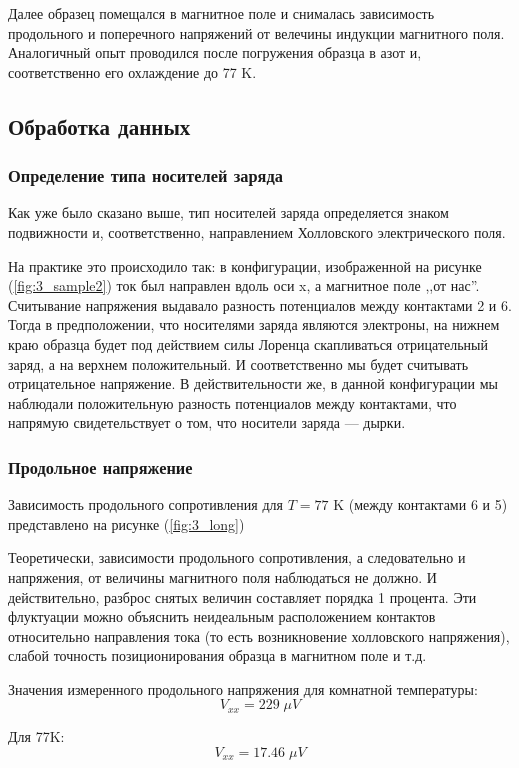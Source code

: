 \documentclass[a4paper, 12pt]{article}
\begin{document}
Далее образец помещался в магнитное поле и снималась зависимость продольного и поперечного напряжений от велечины индукции магнитного поля. Аналогичный опыт проводился после погружения образца в азот и, соответственно его охлаждение до 77 K.

\subsection{Обработка данных}
\subsubsection{Определение типа носителей заряда}
Как уже было сказано выше, тип носителей заряда определяется знаком подвижности и, соответственно, направлением Холловского электрического поля. 

На практике это происходило так: в конфигурации, изображенной на рисунке (\ref{fig:3_sample2}) ток был направлен вдоль оси x, а магнитное поле ,,от нас''. Считывание напряжения выдавало разность потенциалов между контактами 2 и 6. Тогда в предположении, что носителями заряда являются электроны, на нижнем краю образца будет под действием силы Лоренца скапливаться отрицательный заряд, а на верхнем положительный. И соответственно мы будет считывать отрицательное напряжение. В действительности же, в данной конфигурации мы наблюдали положительную разность потенциалов между контактами, что напрямую свидетельствует о том, что носители заряда --- дырки.
\subsubsection{Продольное напряжение}

Зависимость продольного сопротивления для $T=77$ K (между контактами 6 и 5) представлено на рисунке (\ref{fig:3_long})

Теоретически, зависимости продольного сопротивления, а следовательно и напряжения, от величины магнитного поля наблюдаться не должно. И действительно, разброс снятых величин составляет порядка 1 процента. Эти флуктуации можно объяснить неидеальным расположением контактов относительно направления тока (то есть возникновение холловского напряжения), слабой точность позиционирования образца в магнитном поле и т.д. 

Значения измеренного продольного напряжения для комнатной температуры:
$$V_{xx} = 229 \; \mu V  $$

Для 77K:
$$V_{xx} = 17.46 \; \mu V $$
\end{document}
